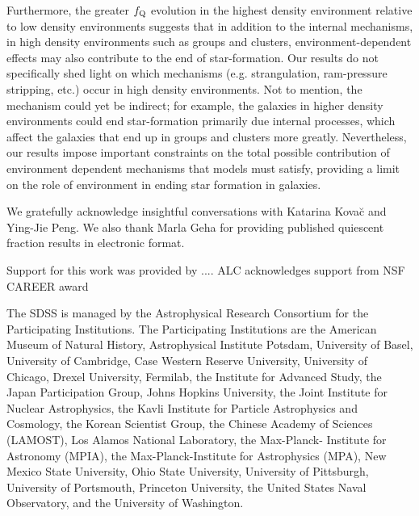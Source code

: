 \documentclass{emulateapj}
\begin{document}
Furthermore, the greater $f_{\rm{Q}}$ evolution in the highest density
environment relative to low density environments suggests that in
addition to the internal mechanisms, in high density environments such
as groups and clusters, environment-dependent effects may also
contribute to the end of star-formation. Our results do not
specifically shed light on which mechanisms (e.g. strangulation,
ram-pressure stripping, etc.) occur in high density environments. Not to 
mention, the mechanism could yet be indirect; for example, the
galaxies in higher density environments could end star-formation
primarily due internal processes, which affect the galaxies that end up
in groups and clusters more greatly.  Nevertheless, our results impose
important constraints on the total possible contribution of
environment dependent mechanisms that models must satisfy, providing a
limit on the role of environment in ending star formation in
galaxies. 

\bigskip 
We gratefully acknowledge insightful conversations with Katarina Kova\u{c} and Ying-Jie Peng. 
We also thank Marla Geha for providing published quiescent fraction results in electronic format.

Support for this work was provided by .... ALC acknowledges support from NSF CAREER award

The SDSS is managed by the Astrophysical Research Consortium for the Participating Institutions. The Participating Institutions are the American Museum of Natural History, Astrophysical Institute Potsdam, University of Basel, University of Cambridge, Case Western Reserve University, University of Chicago, Drexel University, Fermilab, the Institute for Advanced Study, the Japan Participation Group, Johns Hopkins University, the Joint Institute for Nuclear Astrophysics, the Kavli Institute for Particle Astrophysics and Cosmology, the Korean Scientist Group, the Chinese Academy of Sciences (LAMOST), Los Alamos National Laboratory, the Max-Planck- Institute for Astronomy (MPIA), the Max-Planck-Institute for Astrophysics (MPA), New Mexico State University, Ohio State University, University of Pittsburgh, University of Portsmouth, Princeton University, the United States Naval Observatory, and the University of Washington.
%
%

\end{document}
